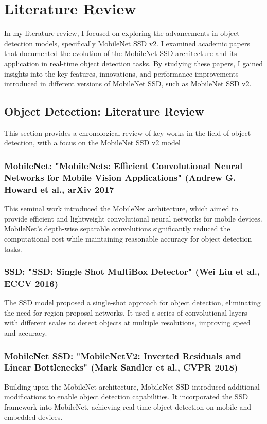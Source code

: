 \chapter{Literature Review}
In my literature review, I focused on exploring the advancements in object detection models, specifically MobileNet SSD v2. I examined academic papers that documented the evolution of the MobileNet SSD architecture and its application in real-time object detection tasks. By studying these papers, I gained insights into the key features, innovations, and performance improvements introduced in different versions of MobileNet SSD, such as MobileNet SSD v2.

\section{Object Detection: Literature Review}
This section provides a chronological review of key works in the field of object detection, with a focus on the MobileNet SSD v2 model

\subsection{MobileNet: "MobileNets: Efficient Convolutional Neural Networks for Mobile Vision Applications" (Andrew G. Howard et al., arXiv 2017}
This seminal work introduced the MobileNet architecture, which aimed to provide efficient and lightweight convolutional neural networks for mobile devices. MobileNet's depth-wise separable convolutions significantly reduced the computational cost while maintaining reasonable accuracy for object detection tasks.

\subsection{SSD: "SSD: Single Shot MultiBox Detector" (Wei Liu et al., ECCV 2016)}
The SSD model proposed a single-shot approach for object detection, eliminating the need for region proposal networks. It used a series of convolutional layers with different scales to detect objects at multiple resolutions, improving speed and accuracy.

\subsection{MobileNet SSD: "MobileNetV2: Inverted Residuals and Linear Bottlenecks" (Mark Sandler et al., CVPR 2018)}
Building upon the MobileNet architecture, MobileNet SSD introduced additional modifications to enable object detection capabilities. It incorporated the SSD framework into MobileNet, achieving real-time object detection on mobile and embedded devices.

